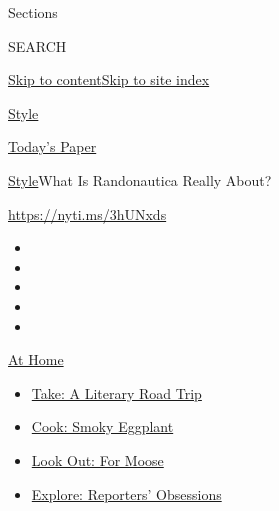Sections

SEARCH

\protect\hyperlink{site-content}{Skip to
content}\protect\hyperlink{site-index}{Skip to site index}

\href{https://www.nytimes3xbfgragh.onion/section/style}{Style}

\href{https://myaccount.nytimes3xbfgragh.onion/auth/login?response_type=cookie\&client_id=vi}{}

\href{https://www.nytimes3xbfgragh.onion/section/todayspaper}{Today's
Paper}

\href{/section/style}{Style}\textbar{}What Is Randonautica Really About?

\url{https://nyti.ms/3hUNxds}

\begin{itemize}
\item
\item
\item
\item
\item
\end{itemize}

\href{https://www.nytimes3xbfgragh.onion/spotlight/at-home?action=click\&pgtype=Article\&state=default\&region=TOP_BANNER\&context=at_home_menu}{At
Home}

\begin{itemize}
\tightlist
\item
  \href{https://www.nytimes3xbfgragh.onion/2020/07/28/books/time-for-a-literary-road-trip.html?action=click\&pgtype=Article\&state=default\&region=TOP_BANNER\&context=at_home_menu}{Take:
  A Literary Road Trip}
\item
  \href{https://www.nytimes3xbfgragh.onion/2020/07/29/magazine/bored-with-your-home-cooking-some-smoky-eggplant-will-fix-that.html?action=click\&pgtype=Article\&state=default\&region=TOP_BANNER\&context=at_home_menu}{Cook:
  Smoky Eggplant}
\item
  \href{https://www.nytimes3xbfgragh.onion/2020/07/27/travel/moose-michigan-isle-royale.html?action=click\&pgtype=Article\&state=default\&region=TOP_BANNER\&context=at_home_menu}{Look
  Out: For Moose}
\item
  \href{https://www.nytimes3xbfgragh.onion/interactive/2020/at-home/even-more-reporters-editors-diaries-lists-recommendations.html?action=click\&pgtype=Article\&state=default\&region=TOP_BANNER\&context=at_home_menu}{Explore:
  Reporters' Obsessions}
\end{itemize}

